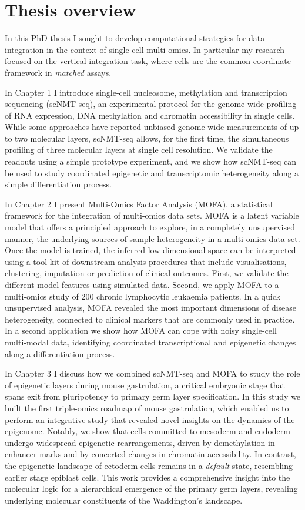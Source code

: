 \section{Thesis overview}

In this PhD thesis I sought to develop computational strategies for data integration in the context of single-cell multi-omics. In particular my research focused on the vertical integration task, where cells are the common coordinate framework in \textit{matched} assays.

In Chapter 1 I introduce single-cell nucleosome, methylation and transcription sequencing (scNMT-seq), an experimental protocol for the genome-wide profiling of RNA expression, DNA methylation and chromatin accessibility in single cells. While some approaches have reported unbiased genome-wide measurements of up to two molecular layers, scNMT-seq allows, for the first time, the simultaneous profiling of three molecular layers at single cell resolution. We validate the readouts using a simple prototype experiment, and we show how scNMT-seq can be used to study coordinated epigenetic and transcriptomic heterogeneity along a simple differentiation process.

In Chapter 2 I present Multi-Omics Factor Analysis (MOFA), a statistical framework for the integration of multi-omics data sets. MOFA is a latent variable model that offers a principled approach to explore, in a completely unsupervised manner, the underlying sources of sample heterogeneity in a multi-omics data set. Once the model is trained, the inferred low-dimensional space can be interpreted using a tool-kit of downstream analysis procedures that include visualisations, clustering, imputation or prediction of clinical outcomes. First, we validate the different model features using simulated data. Second, we apply MOFA to a multi-omics study of 200 chronic lymphocytic leukaemia patients. In a quick unsupervised analysis, MOFA revealed the most important dimensions of disease heterogeneity, connected to clinical markers that are commonly used in practice. In a second application we show how MOFA can cope with noisy single-cell multi-modal data, identifying coordinated transcriptional and epigenetic changes along a differentiation process.

In Chapter 3 I discuss how we combined scNMT-seq and MOFA to study the role of epigenetic layers during mouse gastrulation, a critical embryonic stage that spans exit from pluripotency to primary germ layer specification. In this study we built the first triple-omics roadmap of mouse gastrulation, which enabled us to perform an integrative study that revealed novel insights on the dynamics of the epigenome. Notably, we show that cells committed to mesoderm and endoderm undergo widespread epigenetic rearrangements, driven by demethylation in enhancer marks and by concerted changes in chromatin accessibility. In contrast, the epigenetic landscape of ectoderm cells remains in a \textit{default} state, resembling earlier stage epiblast cells. This work provides a comprehensive insight into the molecular logic for a hierarchical emergence of the primary germ layers, revealing underlying molecular constituents of the Waddington's landscape.

